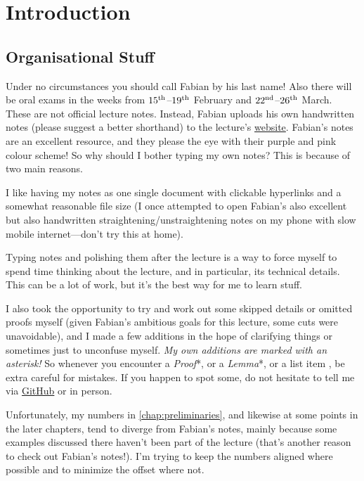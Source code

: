 \chapter{Introduction}
	\section{Organisational Stuff}
	Under no circumstances you should call Fabian by his last name! Also there will be oral exams in the weeks from $15^{\text{th}}$--$19^{\text{th}}$ February and $22^{\text{nd}}$--$26^{\text{th}}$ March.
	These are not official lecture notes. Instead, Fabian uploads his own handwritten notes \cite{KTheory} (please suggest a better shorthand) to the lecture's \href{https://www.math.uni-bonn.de/people/fhebestr/Ktheory/}{website}. Fabian's notes are an excellent resource, and they please the eye with their purple and pink colour scheme! So why should I bother typing my own notes? This is because of two main reasons.
	\begin{alphanumerate}
		\item I like having my notes as one single document with clickable hyperlinks and a somewhat reasonable file size (I once attempted to open Fabian's also excellent but also handwritten straightening/unstraightening notes on my phone with slow mobile internet---don't try this at home).
		\item Typing notes and polishing them after the lecture is a way to force myself to spend time thinking about the lecture, and in particular, its technical details. This can be a lot of work, but it's the best way for me to learn stuff.
	\end{alphanumerate}
	I also took the opportunity to try and work out some skipped details or omitted proofs myself (given Fabian's ambitious goals for this lecture, some cuts were unavoidable), and I made a few additions in the hope of clarifying things or sometimes just to unconfuse myself. \emph{My own additions are marked with an asterisk!} So whenever you encounter a \emph{Proof}*, or a \emph{Lemma}*, or a list item , be extra careful for mistakes. If you happen to spot some, do not hesitate to tell me via \href{https://github.com/FlorianAdler/AlgebraBonn/issues/new}{GitHub} or in person.
	
	Unfortunately, my numbers in \cref{chap:preliminaries}, and likewise at some points in the later chapters, tend to diverge from Fabian's notes, mainly because some examples discussed there haven't been part of the lecture (that's another reason to check out Fabian's notes!). I'm trying to keep the numbers aligned where possible and to minimize the offset where not.
	
